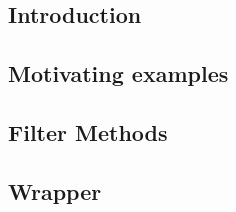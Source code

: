 
\subsection{Introduction}


\subsection{Motivating examples}


\subsection{Filter Methods}

%

%

\subsection{Wrapper}


%

%



